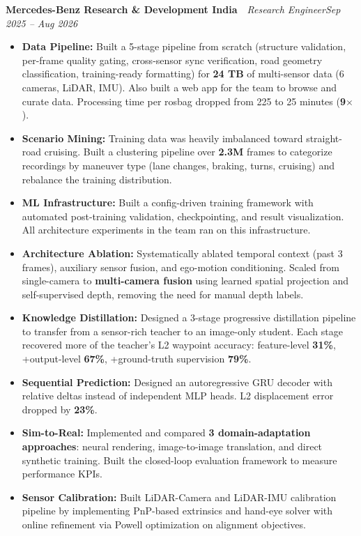 \documentclass[10pt,a4paper]{article}
\newcommand{\cvsep}{\ \textemdash\ }
\newcommand{\cvrole}[3]{%
  \par\vspace{1.6pt}%
  \noindent\textbf{#1}\cvsep{\itshape #2\hfill #3}\par
}
\begin{document}
\cvrole{Mercedes-Benz Research \& Development India}{Research Engineer}{Sep 2025 -- Aug 2026}
\par
\begin{itemize}
  \item \textbf{Data Pipeline:} Built a 5-stage pipeline from scratch (structure validation, per-frame quality gating, cross-sensor sync verification, road geometry classification, training-ready formatting) for \textbf{24 TB} of multi-sensor data (6 cameras, LiDAR, IMU). Also built a web app for the team to browse and curate data. Processing time per rosbag dropped from 225 to 25 minutes (\textbf{9}$\times$).
  \item \textbf{Scenario Mining:} Training data was heavily imbalanced toward straight-road cruising. Built a clustering pipeline over \textbf{2.3M} frames to categorize recordings by maneuver type (lane changes, braking, turns, cruising) and rebalance the training distribution.
  \item \textbf{ML Infrastructure:} Built a config-driven training framework with automated post-training validation, checkpointing, and result visualization. All architecture experiments in the team ran on this infrastructure.
  \item \textbf{Architecture Ablation:} Systematically ablated temporal context (past 3 frames), auxiliary sensor fusion, and ego-motion conditioning. Scaled from single-camera to \textbf{multi-camera fusion} using learned spatial projection and self-supervised depth, removing the need for manual depth labels.
  \item \textbf{Knowledge Distillation:} Designed a 3-stage progressive distillation pipeline to transfer from a sensor-rich teacher to an image-only student. Each stage recovered more of the teacher's L2 waypoint accuracy: feature-level \textbf{31\%}, +output-level \textbf{67\%}, +ground-truth supervision \textbf{79\%}.
  \item \textbf{Sequential Prediction:} Designed an autoregressive GRU decoder with relative deltas instead of independent MLP heads. L2 displacement error dropped by \textbf{23\%}.
  \item \textbf{Sim-to-Real:} Implemented and compared \textbf{3 domain-adaptation approaches}: neural rendering, image-to-image translation, and direct synthetic training. Built the closed-loop evaluation framework to measure performance KPIs.
  \item \textbf{Sensor Calibration:} Built LiDAR-Camera and LiDAR-IMU calibration pipeline by implementing PnP-based extrinsics and hand-eye solver with online refinement via Powell optimization on alignment objectives.
\end{itemize}
\end{document}
